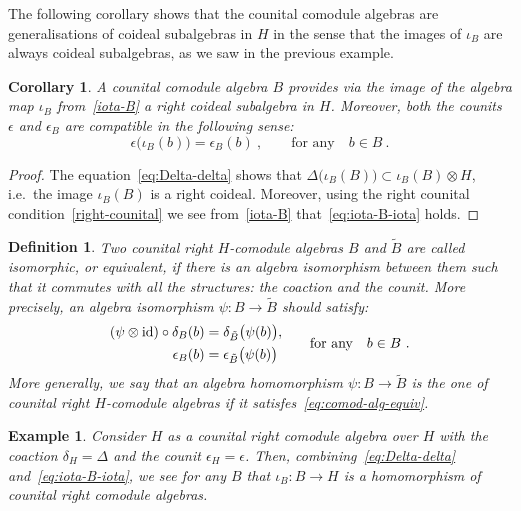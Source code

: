 \documentclass[11pt]{amsart}
\numberwithin{equation}{section}
\newtheorem{cor}[thm]{Corollary}
\newtheorem{example}[thm]{Example}
\newtheorem{defn}[thm]{Definition}
\numberwithin{equation}{section}
\begin{document}
 The following corollary shows that the counital comodule algebras are generalisations of coideal subalgebras in $H$ in the sense that the images of $\iota_B$ are always coideal subalgebras, as we saw in the previous example.

\begin{cor}\label{cor:im-iota}
A counital comodule algebra $B$ provides via the image of the algebra map $\iota_B$ from~\eqref{iota-B} a right coideal subalgebra in $H$. Moreover, both the counits $\epsilon$ and $\epsilon_B$ are compatible in the following sense:
\begin{equation}\label{eq:iota-B-iota}
    \epsilon\bigl(\iota_B(b)\bigr) = \epsilon_B(b)\ , \qquad \text{for any}\quad b\in B\ . 
\end{equation}
\end{cor}
\begin{proof}
	The equation~\eqref{eq:Delta-delta} shows that $\Delta\bigl(\iota_B(B)\bigr) \subset \iota_B(B) \otimes H$, i.e.\ the image $\iota_B(B)$ is a right coideal. 
	Moreover, using the right counital condition~\eqref{right-counital} we see from~\eqref{iota-B} that~\eqref{eq:iota-B-iota} holds.
\end{proof}	


\begin{defn}\label{def:equiv-rel}
Two counital right $H$-comodule algebras $B$ and $\tilde{B}$ are called isomorphic, or equivalent, if there is an algebra isomorphism between them such that it commutes with all the structures: the coaction and the counit. More precisely,
an algebra isomorphism $\psi: B \to \tilde{B}$ should satisfy:
\begin{equation}\label{eq:comod-alg-equiv}
\begin{split}
(\psi\otimes \mathrm{id})\circ \delta_B(b) &= \delta_{\tilde{B}}\bigl(\psi(b)\bigr),\\
 \epsilon_{B}(b) &= \epsilon_{\tilde{B}}\bigl( \psi(b) \bigr)
\end{split}
\qquad \text{for any}\quad b\in B\ .
\end{equation}
More generally, we say that an algebra homomorphism $\psi: B \to \tilde{B}$ is the one of counital right $H$-comodule algebras if it satisfes~\eqref{eq:comod-alg-equiv}.
\end{defn}

\begin{example}
    Consider $H$ as a counital right comodule algebra over $H$ with the coaction $\delta_H=\Delta$ and the counit $\epsilon_H=\epsilon$. Then,
combining~\eqref{eq:Delta-delta} and~\eqref{eq:iota-B-iota}, we see for any $B$ that $\iota_B\colon B \to H$ is a homomorphism of counital right comodule algebras.
\end{example}
\end{document}
